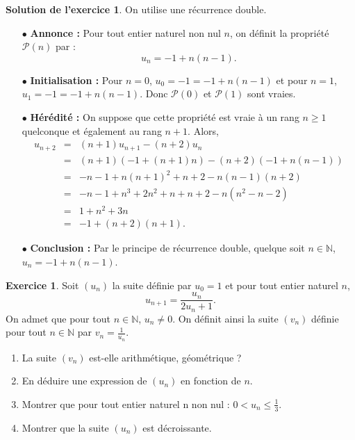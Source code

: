 \documentclass[a4paper, 11pt,openany]{article}%
\theoremstyle{plain}
\theoremstyle{definition}
\newtheorem{exo}{Exercice}
\newtheorem{sol}{Solution de l'exercice}
\theoremstyle{remark}
\newcommand{\N}{\mathbb{N}}
\newcommand{\calP}{\mathcal{P}}
\begin{document}
\begin{sol}
On utilise une récurrence double.
 \begin{itemize}
\item[$\bullet$] \textbf{Annonce :} Pour tout entier naturel non nul $n$, on définit la propriété $\calP(n)$ par : 
\[u_n = -1 + n(n-1).\]
\item[$\bullet$] \textbf{Initialisation :} Pour $n = 0$, $u_0 = -1 = -1 + n(n-1)$ et pour $n=1$, $u_1 =-1 = -1 + n(n-1)$. Donc $\calP(0)$ et $\calP(1)$ sont vraies.
\item[$\bullet$] \textbf{Hérédité :} On suppose que cette propriété est vraie à un rang $n \geqslant 1$ quelconque et également au rang $n+1$. Alors,
\[
\begin{array}{ccl}
u_{n+2}   & =&(n+1)u_{n+1} -(n+2)u_{n}\\ 
&= & (n+1) (-1 +(n+1)n) -(n+2)( -1 + n(n-1))  \\
&= & -n-1 +n(n+1)^2 +n+2-n(n-1)(n+2)  \\
&= & -n - 1 + n^3 + 2n^2 + n + n +2 -n(n^2 - n -2)  \\
&= & 1 +  n^2 +3n \\
&= & -1 +  (n+2)(n+1).
\end{array}
\]
\item[$\bullet$] \textbf{Conclusion :} Par le principe de récurrence double, quelque soit $n \in \N$, $u_n = -1 + n(n-1)$.
\end{itemize}
\end{sol}



\begin{exo}
Soit $(u_n)$ la suite définie par $u_0 = 1$ et pour tout entier naturel $n$, \[ u_{n+1} = \frac{u_n}{2u_n +1}.\]
On admet que pour tout $n \in \N$, $u_n \neq 0$. On définit ainsi la suite $(v_n)$ définie pour tout $n \in \N$ par $v_n = \frac{1}{u_n}$.
\begin{enumerate}
\item La suite $(v_n)$ est-elle arithmétique, géométrique ? 
\item En déduire une expression de $(u_n)$ en fonction de $n$.
\item Montrer que pour tout entier naturel n non nul : $0 < u_n \leqslant \frac{1}{3}$. 
\item Montrer que la suite $(u_n)$ est décroissante.
\end{enumerate}
\end{exo}
\end{document}
